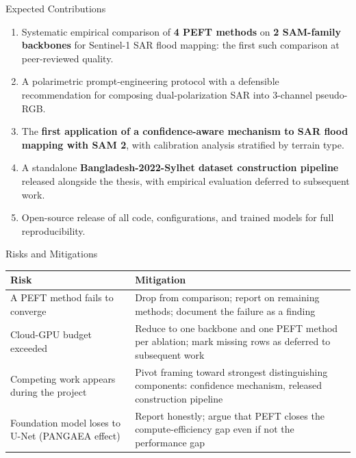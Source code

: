 \documentclass[10pt,aspectratio=169]{beamer}
\begin{document}
\begin{frame}{Expected Contributions}
\begin{enumerate}
\item[\textbf{C1}] Systematic empirical comparison of \textbf{4 PEFT methods} on \textbf{2 SAM-family backbones} for Sentinel-1 SAR flood mapping: the first such comparison at peer-reviewed quality.

\vspace{0.3em}
\item[\textbf{C2}] A polarimetric prompt-engineering protocol with a defensible recommendation for composing dual-polarization SAR into 3-channel pseudo-RGB.

\vspace{0.3em}
\item[\textbf{C3}] The \textbf{first application of a confidence-aware mechanism to SAR flood mapping with SAM 2}, with calibration analysis stratified by terrain type.

\vspace{0.3em}
\item[\textbf{C4}] A standalone \textbf{Bangladesh-2022-Sylhet dataset construction pipeline} released alongside the thesis, with empirical evaluation deferred to subsequent work.

\vspace{0.3em}
\item[\textbf{C5}] Open-source release of all code, configurations, and trained models for full reproducibility.
\end{enumerate}
\end{frame}

\begin{frame}{Risks and Mitigations}
\renewcommand{\arraystretch}{1.4}
\begin{tabularx}{\textwidth}{p{4.5cm} X}
\toprule
\textbf{Risk} & \textbf{Mitigation} \\
\midrule
A PEFT method fails to converge & Drop from comparison; report on remaining methods; document the failure as a finding \\
\midrule
Cloud-GPU budget exceeded & Reduce to one backbone and one PEFT method per ablation; mark missing rows as deferred to subsequent work \\
\midrule
Competing work appears during the project & Pivot framing toward strongest distinguishing components: confidence mechanism, released construction pipeline \\
\midrule
Foundation model loses to U-Net (PANGAEA effect) & Report honestly; argue that PEFT closes the compute-efficiency gap even if not the performance gap \\
\bottomrule
\end{tabularx}
\end{frame}
\end{document}
